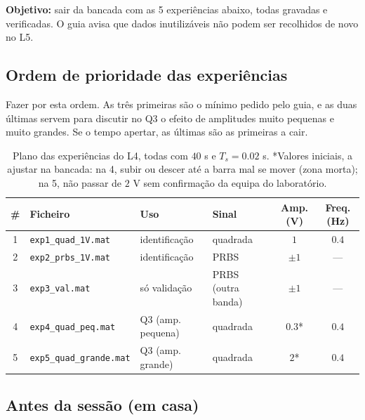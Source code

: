 \documentclass[a4paper,11pt]{article}
\begin{document}
\textbf{Objetivo:} sair da bancada com as 5 experiências abaixo, todas gravadas e verificadas.
O guia avisa que dados inutilizáveis não podem ser recolhidos de novo no L5.

\subsection*{Ordem de prioridade das experiências}

Fazer por esta ordem.
As três primeiras são o mínimo pedido pelo guia, e as duas últimas servem para discutir no Q3 o efeito de amplitudes muito pequenas e muito grandes.
Se o tempo apertar, as últimas são as primeiras a cair.

\begin{table}[H]
  \centering
  \small
  \setlength{\tabcolsep}{4pt}
  \renewcommand{\arraystretch}{1.6}
  \begin{tabular}{|c|l|l|l|c|c|}
    \hline
    \textbf{\#} & \textbf{Ficheiro} & \textbf{Uso} & \textbf{Sinal} & \textbf{Amp. (V)} & \textbf{Freq. (Hz)} \\
    \hline
    1 & \texttt{exp1\_quad\_1V.mat} & identificação & quadrada & $1$ & $0.4$ \\
    \hline
    2 & \texttt{exp2\_prbs\_1V.mat} & identificação & PRBS & $\pm 1$ & --- \\
    \hline
    3 & \texttt{exp3\_val.mat} & só validação & PRBS (outra banda) & $\pm 1$ & --- \\
    \hline
    4 & \texttt{exp4\_quad\_peq.mat} & Q3 (amp. pequena) & quadrada & $0.3$* & $0.4$ \\
    \hline
    5 & \texttt{exp5\_quad\_grande.mat} & Q3 (amp. grande) & quadrada & $2$* & $0.4$ \\
    \hline
  \end{tabular}
  \caption{Plano das experiências do L4, todas com $40$ s e $T_s=0.02$ s.
  *Valores iniciais, a ajustar na bancada: na 4, subir ou descer até a barra mal se mover (zona morta); na 5, não passar de $2$ V sem confirmação da equipa do laboratório.}
\end{table}

\subsection*{Antes da sessão (em casa)}
\end{document}

